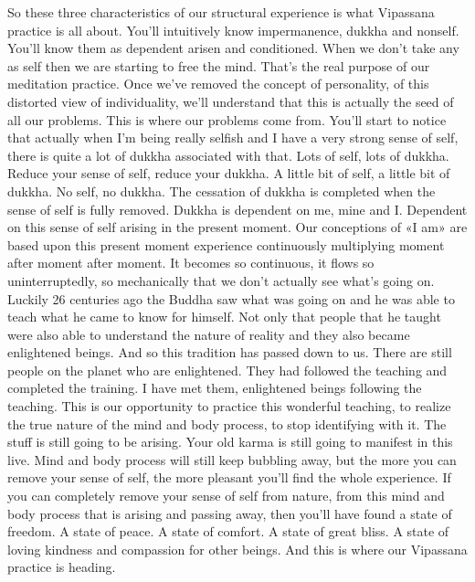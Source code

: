 \documentclass[letterpaper,10pt,english]{sphinxmanual}
\begin{document}
\sphinxAtStartPar
So these three characteristics of our structural experience is what Vipassana  practice  is  all  about. You’ll  intuitively  know  impermanence,  dukkha
and non\sphinxhyphen{}self. You’ll know them as dependent arisen and conditioned. When
we don’t take any as self then we are starting to free the mind. That’s the real
purpose of our meditation practice. Once we’ve removed the concept of personality, of this distorted view of individuality, we’ll understand that this is
actually the seed of all our problems. This is where our problems come from.
  You’ll start to notice that actually when I’m being really selfish and I have a
very strong sense of self, there is quite a lot of dukkha associated with that.
Lots of self, lots of dukkha. Reduce your sense of self, reduce your dukkha.
A little bit of self, a little bit of dukkha. No self, no dukkha. The cessation
of  dukkha  is  completed  when  the  sense  of  self  is  fully  removed.  Dukkha
is dependent on me, mine and I. Dependent on this sense of self arising in
the present moment. Our conceptions of «I am» are based upon this present
moment  experience  continuously  multiplying  moment  after  moment  after
moment. It becomes so continuous, it flows so uninterruptedly, so mechanically that we don’t actually see what’s going on. Luckily 26 centuries ago
the Buddha saw what was going on and he was able to teach what he came
to know for himself. Not only that people that he taught were also able to
understand  the  nature  of  reality  and  they  also  became  enlightened  beings.
And  so  this  tradition  has  passed  down  to  us. There  are  still  people  on  the
planet who are enlightened. They had followed the teaching and completed
the  training.  I  have  met  them,  enlightened  beings  following  the  teaching.
This  is  our  opportunity  to  practice  this  wonderful  teaching,  to  realize  the
true  nature  of  the  mind  and  body  process,  to  stop  identifying  with  it. The
stuff is still going to be arising. Your old karma is still going to manifest in
this live. Mind and body process will still keep bubbling away, but the more
you can remove your sense of self, the more pleasant you’ll find the whole
experience.  If  you  can  completely  remove  your  sense  of  self  from  nature,
from this mind and body process that is arising and passing away, then you’ll
have found a state of freedom. A state of peace. A state of comfort. A state of
great bliss. A state of loving kindness and compassion for other beings. And
this is where our Vipassana practice is heading.
\end{document}
